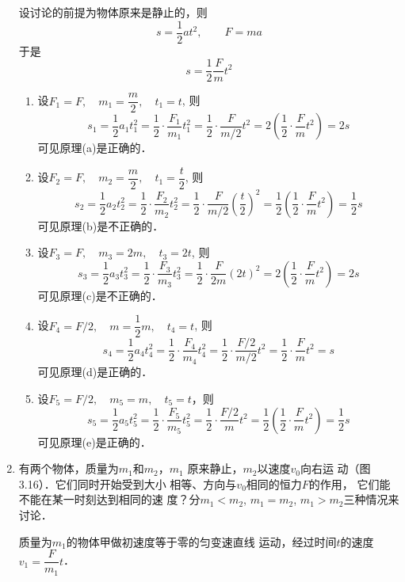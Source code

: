 \begin{enumerate}
\begin{solution}
设讨论的前提为物体原来是静止的，则
\[s=\frac{1}{2}at^2,\qquad F=ma\]
于是\[s=\frac{1}{2}\frac{F}{m}t^2\]
\begin{enumerate}
    \item 设$F_1=F,\quad m_1=\dfrac{m}{2},\quad t_1=t$, 则
\[s_1=\frac{1}{2}a_1t_1^2=\frac{1}{2}\cdot\frac{F_1}{m_1}t^2_1=\frac{1}{2}\cdot \frac{F}{m/2}t^2=2\left(\frac{1}{2}\cdot\frac{F}{m}t^2\right)=2s\]
可见原理(a)是正确的．
\item 设$F_2=F,\quad m_2=\dfrac{m}{2},\quad t_1=\dfrac{t}{2}$, 则
\[s_2=\frac{1}{2}a_2t_2^2=\frac{1}{2}\cdot\frac{F_2}{m_2}t^2_2=\frac{1}{2}\cdot \frac{F}{m/2}\left(\frac{t}{2}\right)^2=\frac{1}{2}\left(\frac{1}{2}\cdot\frac{F}{m}t^2\right)=\frac{1}{2}s\]
可见原理(b)是不正确的．
\item 设$F_3=F,\quad m_3=2m,\quad t_3=2t$, 则
\[s_3=\frac{1}{2}a_3t_3^2=\frac{1}{2}\cdot\frac{F_3}{m_3}t^2_3=\frac{1}{2}\cdot \frac{F}{2m}(2t)^2=2\left(\frac{1}{2}\cdot\frac{F}{m}t^2\right)=2s\]
可见原理(c)是不正确的．
\item 设$F_4=F/2,\quad m=\dfrac{1}{2}m,\quad t_4=t$, 则
\[s_4=\frac{1}{2}a_4t_4^2=\frac{1}{2}\cdot\frac{F_4}{m_4}t^2_4=\frac{1}{2}\cdot \frac{F/2}{m/2}t^2=\frac{1}{2}\cdot\frac{F}{m}t^2=s\]
可见原理(d)是正确的．
\item 设$F_5=F/2,\quad m_5=m,\quad t_5=t$，则
\[s_5=\frac{1}{2}a_5t_5^2=\frac{1}{2}\cdot\frac{F_5}{m_5}t^2_5=\frac{1}{2}\cdot \frac{F/2}{m}t^2=\frac{1}{2}\left(\frac{1}{2}\cdot\frac{F}{m}t^2\right)=\frac{1}{2}s\]
可见原理(e)是正确的．
\end{enumerate}    
    \end{solution}
\item   有两个物体，质量为$m_1$和$m_2$，$m_1$
原来静止，$m_2$以速度$v_0$向右运
动（图3.16）．它们同时开始受到大小
相等、方向与$v_0$相同的恒力$F$的作用，
它们能不能在某一时刻达到相同的速
度？分$m_1<m_2$, $m_1=m_2$, $m_1>m_2$三种情况来讨论．
\begin{figure}[htp]\centering
    \caption{}
    \end{figure}

\begin{solution}    
质量为$m_1$的物体甲做初速度等于零的匀变速直线
运动，经过时间$t$的速度$v_1=\dfrac{F}{m_1}t$．


\end{solution}
\end{enumerate}

